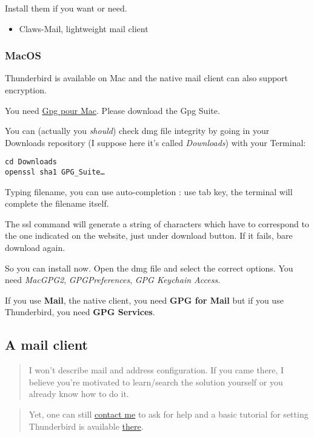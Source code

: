 Install them if you want or need.

\begin{itemize}
\itemsep1pt\parskip0pt
\item
  Claws-Mail, lightweight mail client
\end{itemize}

\subsubsection{MacOS}\label{macos}

Thunderbird is available on Mac and the native mail client can also
support encryption.

You need \href{https://gpgtools.org/}{Gpg pour Mac}. Please download the
Gpg Suite.

You can (actually you \emph{should}) check dmg file integrity by going
in your Downloads repository (I suppose here it's called
\emph{Downloads}) with your Terminal:

\begin{verbatim}
cd Downloads
openssl sha1 GPG_Suite…
\end{verbatim}

Typing filename, you can use auto-completion : use tab key, the terminal
will complete the filename itself.

The ssl command will generate a string of characters which have to
correspond to the one indicated on the website, just under download
button. If it fails, bare download again.

So you can install now. Open the dmg file and select the correct
options. You need \emph{MacGPG2}, \emph{GPGPreferences}, \emph{GPG
Keychain Access}.

If you use \textbf{Mail}, the native client, you need \textbf{GPG for
Mail} but if you use Thunderbird, you need \textbf{GPG Services}.

\subsection{A mail client}\label{a-mail-client}

\begin{quote}
I won't describe mail and address configuration. If you came there, I
believe you're motivated to learn/search the solution yourself or you
already know how to do it.
\end{quote}

\begin{quote}
Yet, one can still \href{\{filename\}../pages/contact.md}{contact me} to
ask for help and a basic tutorial for setting Thunderbird is available
\href{https://support.mozilla.org/en-US/kb/new-email-address}{there}.
\end{quote}

